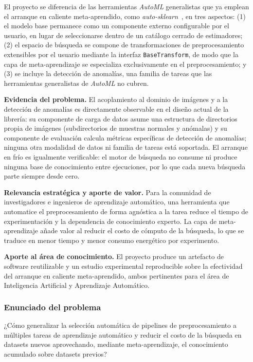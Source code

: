 \documentclass[12pt,letterpaper]{article}
\begin{document}
El proyecto se diferencia de las herramientas \textit{AutoML} generalistas que ya emplean el arranque en caliente meta-aprendido, como \textit{auto-sklearn}~\cite{feurer2015autosklearn, feurer2015warmstart}, en tres aspectos: (1) el modelo base permanece como un componente externo configurable por el usuario, en lugar de seleccionarse dentro de un catálogo cerrado de estimadores; (2) el espacio de búsqueda se compone de transformaciones de preprocesamiento extensibles por el usuario mediante la interfaz \texttt{BaseTransform}, de modo que la capa de meta-aprendizaje se especializa exclusivamente en el preprocesamiento; y (3) se incluye la detección de anomalías, una familia de tareas que las herramientas generalistas de \textit{AutoML} no cubren.

\textbf{Evidencia del problema.} El acoplamiento al dominio de imágenes y a la detección de anomalías es directamente observable en el diseño actual de la librería: su componente de carga de datos asume una estructura de directorios propia de imágenes (subdirectorios de muestras normales y anómalas) y su componente de evaluación calcula métricas específicas de detección de anomalías; ninguna otra modalidad de datos ni familia de tareas está soportada. El arranque en frío es igualmente verificable: el motor de búsqueda no consume ni produce ninguna base de conocimiento entre ejecuciones, por lo que cada nueva búsqueda parte siempre desde cero.

\textbf{Relevancia estratégica y aporte de valor.} Para la comunidad de investigadores e ingenieros de aprendizaje automático, una herramienta que automatice el preprocesamiento de forma agnóstica a la tarea reduce el tiempo de experimentación y la dependencia de conocimiento experto. La capa de meta-aprendizaje añade valor al reducir el costo de cómputo de la búsqueda, lo que se traduce en menor tiempo y menor consumo energético por experimento.

\textbf{Aporte al área de conocimiento.} El proyecto produce un artefacto de software reutilizable y un estudio experimental reproducible sobre la efectividad del arranque en caliente meta-aprendido, ambos pertinentes para el área de Inteligencia Artificial y Aprendizaje Automático.

\subsubsection{Enunciado del problema}

¿Cómo generalizar la selección automática de pipelines de preprocesamiento a múltiples tareas de aprendizaje automático y reducir el costo de la búsqueda en datasets nuevos aprovechando, mediante meta-aprendizaje, el conocimiento acumulado sobre datasets previos?
\end{document}

